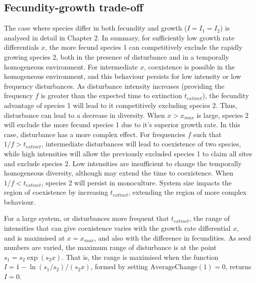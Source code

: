 \subsection{Fecundity-growth trade-off}
The case where species differ in both fecundity and growth ($I=I_1=I_2$) is analysed in detail in Chapter 2. In summary, for sufficiently low growth rate differentials $x$,  the more fecund species 1 can competitively exclude the rapidly growing species 2, both in the presence of disturbance and in a temporally homogeneous environment. For intermediate $x$, coexistence is possible in the homogeneous environment, and this behaviour persists for low intensity or low frequency disturbances. As disturbance intensity increases (providing the frequency $f$ is greater than the expected time to extinction $t_{extinct}$), the fecundity advantage of species 1 will lead to it competitively excluding species 2. Thus, disturbance can lead to a decrease in diversity. When $x>x_{max}$ is large, species 2 will exclude the more fecund species 1 due to it's superior growth rate. In this case, disturbance has a more complex effect. For frequencies $f$ such that $1/f > t_{extinct}$, intermediate disturbances will lead to coexistence of two species, while high intensities will allow the previously excluded species 1 to claim all sites and exclude species 2. Low intensities are insufficient to change the temporally homogeneous diversity, although may extend the time to coexistence. When $1/f < t_{extinct}$, species 2 will persist in monoculture. System size impacts the region of coexistence by increasing $t_{extinct}$, extending the region of more complex behaviour.

For a large system, or disturbances more frequent that $t_{extinct}$, the range of intensities that can give coexistence varies with the growth rate differential $x$, and is maximised at $x=x_{max}$, and also with the difference in fecundities. As seed numbers are varied, the maximum range of disturbance is at the point $s_1=s_2\exp(s_2x)$. That is, the range is maximised when the function $I=1-\ln(s_1/s_2)/(s_2x)$, formed by setting $\text{AverageChange}(1)=0$, returns $I=0$.

